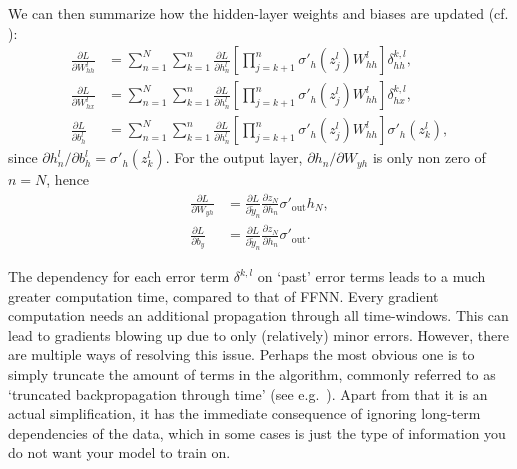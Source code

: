 \documentclass[%
reprint,
amsmath,amssymb,
aps,
]{revtex4-2}
\begin{document}
We can then summarize how the hidden-layer weights and biases are updated (cf. \cite{superGood}):
\begin{subequations}	\label{eq:gradients_hidden}
	\begin{align}
		\frac{\partial L}{\partial W_{hh}^{l}} &= \sum_{n=1}^{N}\sum_{k=1}^{n}\frac{\partial L}{\partial h_{n}^{l}}  \left[ \prod_{j=k+1}^{n} \sigma'_{h}(z_{j}^{l})W_{hh}^{l}\right] \delta^{k,l}_{hh}, \\
		\frac{\partial L}{\partial W_{hx}^{l}} &= \sum_{n=1}^{N}\sum_{k=1}^{n}\frac{\partial L}{\partial h_{n}^{l}}  \left[ \prod_{j=k+1}^{n} \sigma'_{h}(z_{j}^{l})W_{hh}^{l}\right] \delta^{k,l}_{hx}, \\
		\frac{\partial L}{\partial b_{h}^{l}} &= \sum_{n=1}^{N}\sum_{k=1}^{n}\frac{\partial L}{\partial h_{n}^{l}}  \left[ \prod_{j=k+1}^{n} \sigma'_{h}(z_{j}^{l})W_{hh}^{l}\right] \sigma'_{h}(z_k^l),
	\end{align}
\end{subequations}
since \(\partial h^{l}_{n}/\partial b_{h}^{l} = \sigma'_{h}(z_k^l)\). For the output layer, \(\partial h_n/\partial W_{yh}\) is only non zero of \(n=N\), hence
\begin{subequations}	\label{eq:gradients_out}
	\begin{align}
		\frac{\partial L}{\partial W_{yh}} &= \frac{\partial L}{\partial \tilde{y}_{n}} \frac{\partial z_N}{\partial h_{n}} \sigma'_{\text{out}} h_{N}, \\
		\frac{\partial L}{\partial b_{y}} &= \frac{\partial L}{\partial \tilde{y}_{n}} \frac{\partial z_N}{\partial h_{n}} \sigma'_{\text{out}}.
	\end{align}
\end{subequations}

The dependency for each error term \(\delta^{k,l}\) on `past' error terms leads to a much greater computation time, compared to that of FFNN. Every gradient computation needs an additional propagation through all time-windows. This can lead to gradients blowing up due to only (relatively) minor errors. However, there are multiple ways of resolving this issue. Perhaps the most obvious one is to simply truncate the amount of terms in the algorithm, commonly referred to as `truncated backpropagation through time' (see e.g.~\cite{tallec2017unbiasingtruncatedbackpropagationtime}). Apart from that it is an actual simplification, it has the immediate consequence of ignoring long-term dependencies of the data, which in some cases is just the type of information you do not want your model to train on.
\end{document}
